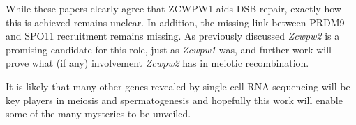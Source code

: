 While these papers clearly agree that ZCWPW1 aids DSB repair, exactly how this is achieved remains unclear. In addition, the missing link between PRDM9 and SPO11 recruitment remains missing. As previously discussed \textit{Zcwpw2} is a promising candidate for this role, just as \textit{Zcwpw1} was, and further work will prove what (if any) involvement \textit{Zcwpw2} has in meiotic recombination.

It is likely that many other genes revealed by single cell RNA sequencing will be key players in meiosis and spermatogenesis and hopefully this work will enable some of the many mysteries to be unveiled.

